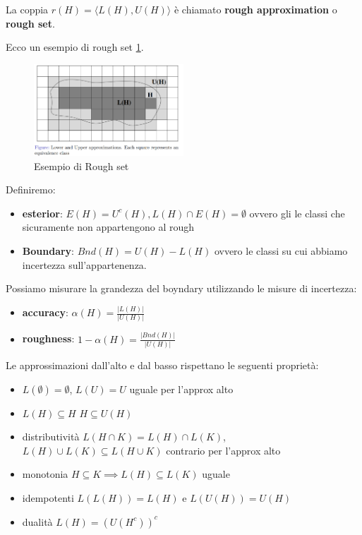 \begin{definizione}
    La coppia $r(H) = \langle L(H), U(H)\rangle$ è chiamato \textbf{rough approximation} o
    \textbf{rough set}.
\end{definizione}
Ecco un esempio di rough set \ref*{fig:rs}.

\begin{figure}[!h]
    \centering
    \includegraphics[width=0.5\textwidth]{img/sistemi_incerti/rs.png}
    \caption*{Esempio di Rough set}
    \label{fig:rs}
\end{figure}

Definiremo:
\begin{itemize}
    \item \textbf{esterior}: $E(H) = U^c(H), L(H)\cap E(H) = \emptyset$ ovvero gli 
    le classi che sicuramente non appartengono al rough
    \item \textbf{Boundary}: $Bnd(H) = U(H) - L(H)$ ovvero 
    le classi su cui abbiamo incertezza sull'appartenenza.
\end{itemize}

Possiamo misurare la grandezza del boyndary utilizzando le misure di incertezza:
\begin{itemize}
    \item \textbf{accuracy}: $\alpha(H) = \frac{|L(H)|}{|U(H)|}$
    \item \textbf{roughness}: $1-\alpha(H) = \frac{|Bnd(H)|}{|U(H)|}$
\end{itemize}

Le approssimazioni dall'alto e dal basso rispettano le seguenti proprietà:
\begin{itemize}
    \item $L(\emptyset)= \emptyset$, $L(U)=U$ uguale per l'approx alto
    \item $L(H)\subseteq H$ $H\subseteq U(H)$ 
    \item distributività $L(H\cap K)= L(H) \cap L(K) $, $L(H) \cup L(K) \subseteq L(H\cup K) $ contrario per l'approx alto
    \item monotonia $H\subseteq K\implies L(H)\subseteq L(K)$ uguale
    \item idempotenti $L(L(H)) = L(H)$ e $L(U(H)) = U(H)$
    \item dualità $L(H) = (U(H^c))^c$
\end{itemize}

